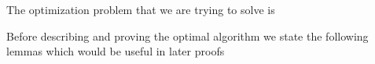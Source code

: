 The optimization problem that we are trying to solve is 

Before describing and proving the optimal algorithm we state the following lemmas which would be useful in later proofs



